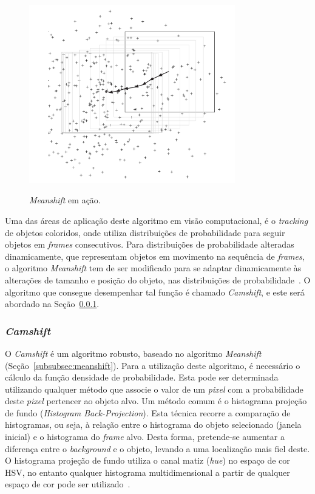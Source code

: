 \begin{figure}[!hbtp]
  \centering
   \caption{\textit{Meanshift} em ação.}
    \includegraphics[width = 0.8\textwidth]{Caps/Figs/ref-teorico/meanshift.PNG}
   \label{fig:meanshift}
\end{figure}

Uma das áreas de aplicação deste algoritmo em visão computacional, é o \textit{tracking} de objetos coloridos, onde utiliza distribuições de probabilidade para seguir objetos em \textit{frames} consecutivos. Para distribuições de probabilidade alteradas dinamicamente, que representam objetos em movimento na sequência de \textit{frames}, o algoritmo \textit{Meanshift} tem de ser modificado para se adaptar dinamicamente às alterações de tamanho e posição do objeto, nas distribuições de probabilidade~\cite{peixoto2012deteccao}. O algoritmo que consegue desempenhar tal função é chamado \textit{Camshift}, e este será abordado na Seção~\ref{subsubsec:camshift}.

\subsubsection{\textit{Camshift}}
\label{subsubsec:camshift}

O \textit{Camshift} é um algoritmo robusto, baseado no algoritmo \textit{Meanshift} (Seção~\ref{subsubsec:meanshift}). Para a utilização deste algoritmo, é necessário o cálculo da função densidade de probabilidade. Esta pode ser determinada utilizando qualquer método que associe o valor de um \textit{pixel} com a probabilidade deste \textit{pixel} pertencer ao objeto alvo. Um método comum é o histograma projeção de fundo (\textit{Histogram Back-Projection}). Esta técnica recorre a comparação de histogramas, ou seja, à relação entre o histograma do objeto selecionado (janela inicial) e o histograma do \textit{frame} alvo. Desta forma, pretende-se aumentar a diferença entre o \textit{background} e o objeto, levando a uma localização mais fiel deste. O histograma projeção de fundo utiliza o canal matiz (\textit{hue}) no espaço de cor HSV, no entanto qualquer histograma multidimensional a partir de qualquer espaço de cor pode ser utilizado~\cite{peixoto2012deteccao}.

